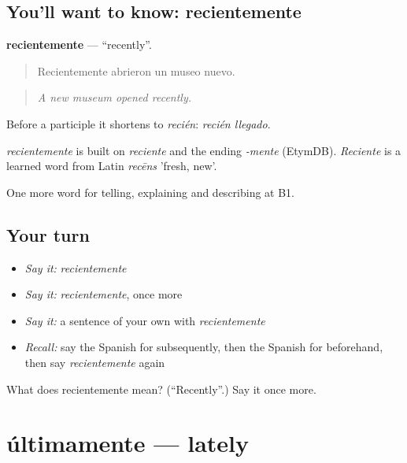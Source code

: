 \subsection*{You'll want to know: recientemente}
\textbf{recientemente} — \textquotedblleft{}recently\textquotedblright{}.

\begin{quote}
Recientemente abrieron un museo nuevo.
\end{quote}

\begin{quote}
\emph{A new museum opened recently.}
\end{quote}

Before a participle it shortens to \emph{recién}: \emph{recién llegado}.

\begin{cousinweb}
\emph{recientemente} is built on \emph{reciente} and the ending \emph{-mente} (EtymDB). \emph{Reciente} is a learned word from Latin \emph{recēns} 'fresh, new'.
\end{cousinweb}

\begin{grammarlens}[title={What you've built}]
One more word for telling, explaining and describing at B1.
\end{grammarlens}

\subsection*{Your turn}
\begin{itemize}
\raggedright
  \item \emph{Say it:} \emph{recientemente}
  \item \emph{Say it:} \emph{recientemente}, once more
  \item \emph{Say it:} a sentence of your own with \emph{recientemente}
  \item \emph{Recall:} say the Spanish for subsequently, then the Spanish for beforehand, then say \emph{recientemente} again
\end{itemize}

\begin{tcolorbox}[breakable,colback=teal!4,colframe=teal!35!black,title={Before you move on}]
What does recientemente mean? (\textquotedblleft{}Recently\textquotedblright{}.) Say it once more.
\end{tcolorbox}
\section[últimamente]{últimamente — lately}

